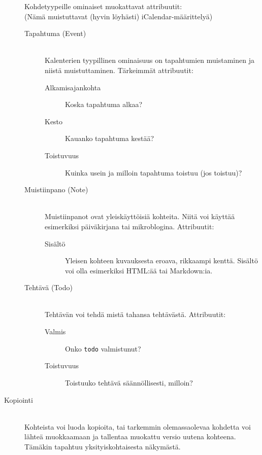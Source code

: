 \documentclass[a4paper,12pt]{report}
\begin{document}
\begin{description}
      Kohdetyypeille ominaiset muokattavat attribuutit:
      \\(Nämä muistuttavat (hyvin löyhästi) iCalendar-määrittelyä)
      \begin{description}
         \item[Tapahtuma (Event)] \hfill\\
            Kalenterien tyypillinen ominaisuus on tapahtumien muistaminen ja
            niistä muistuttaminen. Tärkeimmät attribuutit:
            \begin{description}
               \item[Alkamisajankohta]  Koska tapahtuma alkaa?
               \item[Kesto]  Kauanko tapahtuma kestää?
               \item[Toistuvuus] Kuinka usein ja milloin tapahtuma toistuu (jos
                  toistuu)?
            \end{description}

         \item[Muistiinpano (Note)] \hfill\\
            Muistiinpanot ovat yleiskäyttöisiä
            kohteita.  Niitä voi käyttää esimerkiksi päiväkirjana tai
            mikroblogina. Attribuutit:
            \begin{description}
               \item[Sisältö] Yleisen kohteen kuvauksesta eroava, rikkaampi
                  kenttä. Sisältö voi olla esimerkiksi HTML:ää tai Markdown:ia.
            \end{description}

         \item[Tehtävä (Todo)] \hfill\\
            Tehtävän voi tehdä mistä tahansa tehtävästä. Attribuutit:
            \begin{description}
               \item[Valmis] Onko \texttt{todo} valmistunut?
               \item[Toistuvuus] Toistuuko tehtävä säännöllisesti, milloin?
            \end{description}
      \end{description}

   \item[Kopiointi]\hfill\\
      Kohteista voi luoda kopioita, tai tarkemmin olemassa\-olevaa kohdetta voi
      läh\-teä muokkaamaan ja tallentaa muokattu versio uutena kohteena. Tämäkin
      tapahtuu yksityiskohtaisesta näkymästä.


\end{description}
\end{document}
